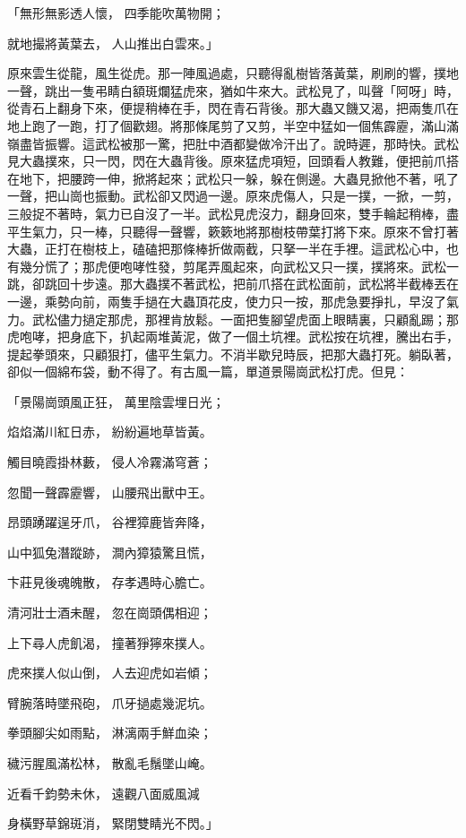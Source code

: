 「無形無影透人懷，  四季能吹萬物開；

就地撮將黃葉去，  人山推出白雲來。」

原來雲生從龍，風生從虎。那一陣風過處，只聽得亂樹皆落黃葉，刷刷的響，撲地一聲，跳出一隻弔睛白額斑爛猛虎來，猶如牛來大。武松見了，叫聲「阿呀」時，從青石上翻身下來，便提稍棒在手，閃在青石背後。那大蟲又饑又渴，把兩隻爪在地上跑了一跑，打了個歡翅。將那條尾剪了又剪，半空中猛如一個焦霹靂，滿山滿嶺盡皆振響。這武松被那一驚，把肚中酒都變做冷汗出了。說時遲，那時快。武松見大蟲撲來，只一閃，閃在大蟲背後。原來猛虎項短，回頭看人教難，便把前爪搭在地下，把腰跨一伸，掀將起來；武松只一躲，躲在側邊。大蟲見掀他不著，吼了一聲，把山崗也振動。武松卻又閃過一邊。原來虎傷人，只是一撲，一掀，一剪，三般捉不著時，氣力已自沒了一半。武松見虎沒力，翻身回來，雙手輪起稍棒，盡平生氣力，只一棒，只聽得一聲響，簌簌地將那樹枝帶葉打將下來。原來不曾打著大蟲，正打在樹枝上，磕磕把那條棒折做兩截，只拏一半在手裡。這武松心中，也有幾分慌了；那虎便咆哮性發，剪尾弄風起來，向武松又只一撲，撲將來。武松一跳，卻跳回十步遠。那大蟲撲不著武松，把前爪搭在武松面前，武松將半截棒丟在一邊，乘勢向前，兩隻手撾在大蟲頂花皮，使力只一按，那虎急要掙扎，早沒了氣力。武松儘力撾定那虎，那裡肯放鬆。一面把隻腳望虎面上眼睛裏，只顧亂踢；那虎咆哮，把身底下，扒起兩堆黃泥，做了一個土坑裡。武松按在坑裡，騰出右手，提起拳頭來，只顧狠打，儘平生氣力。不消半歇兒時辰，把那大蟲打死。躺臥著，卻似一個綿布袋，動不得了。有古風一篇，單道景陽崗武松打虎。但見：

「景陽崗頭風正狂，  萬里陰雲埋日光；

焰焰滿川紅日赤，  紛紛遍地草皆黃。

觸目曉霞掛林藪，  侵人冷霧滿穹蒼；

忽聞一聲霹靂響，  山腰飛出獸中王。

昂頭踴躍逞牙爪，  谷裡獐鹿皆奔降，

山中狐兔潛蹤跡，  澗內獐猿驚且慌，

卞莊見後魂魄散，  存孝遇時心膽亡。

清河壯士酒未醒，  忽在崗頭偶相迎；

上下尋人虎飢渴，  撞著猙獰來撲人。

虎來撲人似山倒，  人去迎虎如岩傾；

臂腕落時墜飛砲，  爪牙撾處幾泥坑。

拳頭腳尖如雨點，  淋漓兩手鮮血染；

穢污腥風滿松林，  散亂毛鬚墜山崦。

近看千鈞勢未休，  遠觀八面威風減

身橫野草錦斑消，  緊閉雙睛光不閃。」

